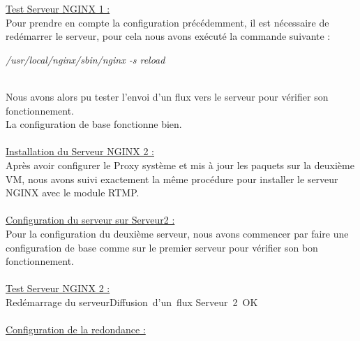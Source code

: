 \documentclass{report}
\begin{document}
    \underline{Test Serveur NGINX 1 :}\\
    
    Pour prendre en compte la configuration précédemment, il est nécessaire de redémarrer le serveur, pour cela nous avons exécuté la commande suivante :\\


    \begin{center}
    
    \textit{ /usr/local/nginx/sbin/nginx -s reload}
    
    \end{center}


    \\
    Nous avons alors pu tester l’envoi d’un flux vers le serveur pour vérifier son fonctionnement.
    \\
    La configuration de base fonctionne bien.
    \\
    \\
    
    \underline{Installation du Serveur NGINX 2 :}\\
    
    Après avoir configurer le Proxy système et mis à jour les paquets sur la deuxième VM, nous avons suivi exactement la même procédure pour installer le serveur NGINX avec le module RTMP.
    \\
    \\
    
    \underline{Configuration du serveur sur Serveur2 :}\\
    
    Pour la configuration du deuxième serveur, nous avons commencer par faire une configuration de base comme sur le premier serveur pour vérifier son bon fonctionnement.
    \\
    \\
    
    \underline{Test Serveur NGINX 2 :}\\
    
    Redémarrage du serveur\rightarrow Diffusion~d’un~flux \rightarrow Serveur~2~OK\\
    
    \\
    
    \underline{Configuration de la redondance : }\\
    
\end{document}
